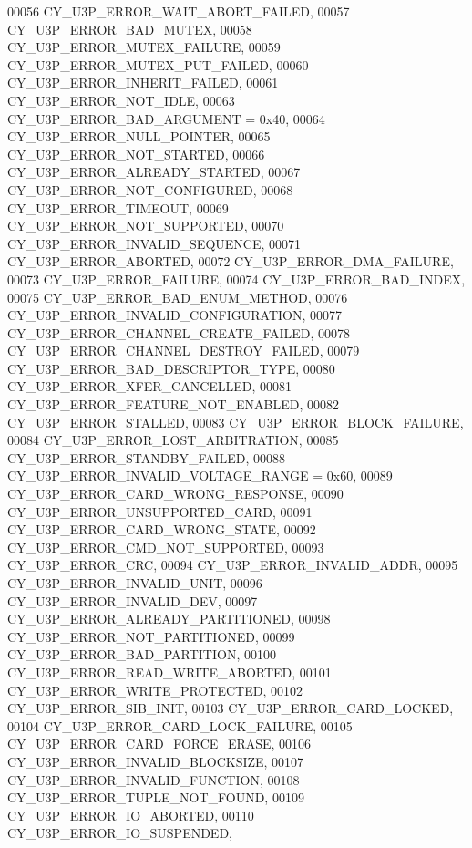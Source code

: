 \begin{DoxyCode}
00056     CY_U3P_ERROR_WAIT_ABORT_FAILED,     
00057     CY_U3P_ERROR_BAD_MUTEX,             
00058     CY_U3P_ERROR_MUTEX_FAILURE,         
00059     CY_U3P_ERROR_MUTEX_PUT_FAILED,      
00060     CY_U3P_ERROR_INHERIT_FAILED,        
00061     CY_U3P_ERROR_NOT_IDLE,              
00063     CY_U3P_ERROR_BAD_ARGUMENT = 0x40,   
00064     CY_U3P_ERROR_NULL_POINTER,          
00065     CY_U3P_ERROR_NOT_STARTED,           
00066     CY_U3P_ERROR_ALREADY_STARTED,       
00067     CY_U3P_ERROR_NOT_CONFIGURED,        
00068     CY_U3P_ERROR_TIMEOUT,               
00069     CY_U3P_ERROR_NOT_SUPPORTED,         
00070     CY_U3P_ERROR_INVALID_SEQUENCE,      
00071     CY_U3P_ERROR_ABORTED,               
00072     CY_U3P_ERROR_DMA_FAILURE,           
00073     CY_U3P_ERROR_FAILURE,               
00074     CY_U3P_ERROR_BAD_INDEX,             
00075     CY_U3P_ERROR_BAD_ENUM_METHOD,       
00076     CY_U3P_ERROR_INVALID_CONFIGURATION, 
00077     CY_U3P_ERROR_CHANNEL_CREATE_FAILED, 
00078     CY_U3P_ERROR_CHANNEL_DESTROY_FAILED,
00079     CY_U3P_ERROR_BAD_DESCRIPTOR_TYPE,   
00080     CY_U3P_ERROR_XFER_CANCELLED,        
00081     CY_U3P_ERROR_FEATURE_NOT_ENABLED,   
00082     CY_U3P_ERROR_STALLED,               
00083     CY_U3P_ERROR_BLOCK_FAILURE,         
00084     CY_U3P_ERROR_LOST_ARBITRATION,      
00085     CY_U3P_ERROR_STANDBY_FAILED,        
00088     CY_U3P_ERROR_INVALID_VOLTAGE_RANGE = 0x60,  
00089     CY_U3P_ERROR_CARD_WRONG_RESPONSE,           
00090     CY_U3P_ERROR_UNSUPPORTED_CARD,              
00091     CY_U3P_ERROR_CARD_WRONG_STATE,              
00092     CY_U3P_ERROR_CMD_NOT_SUPPORTED,             
00093     CY_U3P_ERROR_CRC,                           
00094     CY_U3P_ERROR_INVALID_ADDR,                  
00095     CY_U3P_ERROR_INVALID_UNIT,                  
00096     CY_U3P_ERROR_INVALID_DEV,                   
00097     CY_U3P_ERROR_ALREADY_PARTITIONED,           
00098     CY_U3P_ERROR_NOT_PARTITIONED,               
00099     CY_U3P_ERROR_BAD_PARTITION,                 
00100     CY_U3P_ERROR_READ_WRITE_ABORTED,            
00101     CY_U3P_ERROR_WRITE_PROTECTED,               
00102     CY_U3P_ERROR_SIB_INIT,                      
00103     CY_U3P_ERROR_CARD_LOCKED,                   
00104     CY_U3P_ERROR_CARD_LOCK_FAILURE,             
00105     CY_U3P_ERROR_CARD_FORCE_ERASE,              
00106     CY_U3P_ERROR_INVALID_BLOCKSIZE,             
00107     CY_U3P_ERROR_INVALID_FUNCTION,              
00108     CY_U3P_ERROR_TUPLE_NOT_FOUND,               
00109     CY_U3P_ERROR_IO_ABORTED,                    
00110     CY_U3P_ERROR_IO_SUSPENDED,              

\end{DoxyCode}

